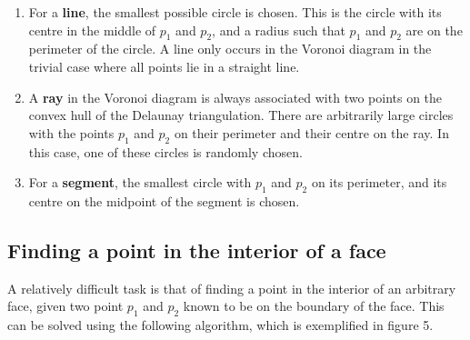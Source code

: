 \documentclass[a4paper,12pt]{article}
\begin{document}
\begin{enumerate}
\item
For a {\bf line}, the smallest possible circle is chosen. This is the circle with its centre in the middle of $p_1$ and $p_2$, and a radius such that $p_1$ and $p_2$ are on the perimeter of the circle. A line only occurs in the Voronoi diagram in the trivial case where all points lie in a straight line.
\item
A {\bf ray} in the Voronoi diagram is always associated with two points on the convex hull of the Delaunay triangulation. There are arbitrarily large circles with the points $p_1$ and $p_2$ on their perimeter and their centre on the ray. In this case, one of these circles is randomly chosen.
\item
For a {\bf segment}, the smallest circle with $p_1$ and $p_2$ on its perimeter, and its centre on the midpoint of the segment is chosen.
\end{enumerate}

\subsection{Finding a point in the interior of a face}
\label{sec:findPoints}
A relatively difficult task is that of finding a point in the interior of an arbitrary face, given two point $p_1$ and $p_2$ known to be on the boundary of the face. This can be solved using the following algorithm, which is exemplified in figure 5.
\end{document}
